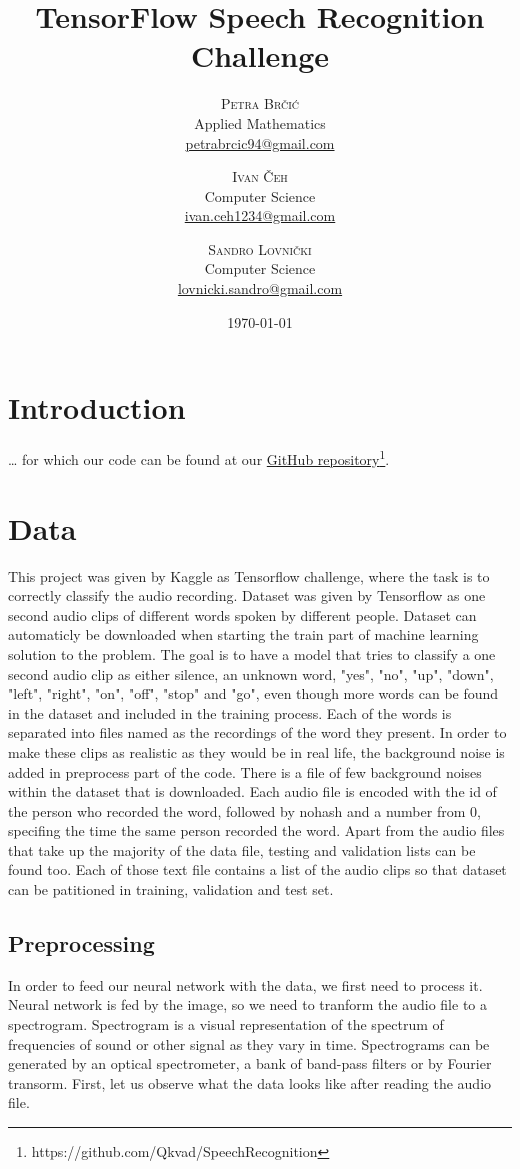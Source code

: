 \documentclass[twoside]{article}
\title{TensorFlow Speech Recognition Challenge} %
\author{%
\textsc{Petra Br\v{c}i\'c}\\%
\normalsize Applied Mathematics \\
\normalsize \href{mailto:petrabrcic94@gmail.com}{petrabrcic94@gmail.com} 
\and
\textsc{Ivan \v{C}eh}\\%
\normalsize Computer Science \\
\normalsize \href{mailto:ivan.ceh1234@gmail.com}{ivan.ceh1234@gmail.com} 
\and
\textsc{Sandro Lovni\v{c}ki}\\%
\normalsize Computer Science \\ 
\normalsize \href{mailto:lovnicki.sandro@gmail.com}{lovnicki.sandro@gmail.com}
}
\date{\today}
\begin{document}
\maketitle
\tableofcontents
\newpage

\begin{multicols}{2}

\section{Introduction}

\ldots
for which our code can be found at our \hyperref[https://github.com/Qkvad/3rdOrderTensors]{GitHub repository}\footnote{https://github.com/Qkvad/SpeechRecognition}.

\section{Data}
This project was given by Kaggle as Tensorflow challenge, where the task is to correctly classify the audio recording. Dataset was given by Tensorflow as one second audio clips of different words spoken by different people. Dataset can automaticly be downloaded when starting the train part of machine learning solution to the problem. 
The goal is to have a model that tries to classify a one second audio clip as either silence, an unknown word, "yes", "no", "up", "down", "left", "right", "on", "off", "stop" and "go", even though more words can be found in the dataset and included in the training process. Each of the words is separated into files named as the recordings of the word they present. In order to make these clips as realistic as they would be in real life, the background noise is added in preprocess part of the code. There is a file of few background noises within the dataset that is downloaded. 
Each audio file is encoded with the id of the person who recorded the word, followed by nohash and a number from 0, specifing the time the same person recorded the word.  
Apart from the audio files that take up the majority of the data file, testing and validation lists can be found too. Each of those text file contains a list of the audio clips so that dataset can be patitioned in training, validation and test set. 
\subsection{Preprocessing}
In order to feed our neural network with the data, we first need to process it. Neural network is fed by the image, so we need to tranform the audio file to a spectrogram. Spectrogram is a visual representation of the spectrum of frequencies of sound or other signal as they vary in time. Spectrograms can be generated by an optical spectrometer, a bank of band-pass filters or by Fourier transorm. 
First, let us observe what the data looks like after reading the audio file. \\
 

\end{multicols}
\end{document}
